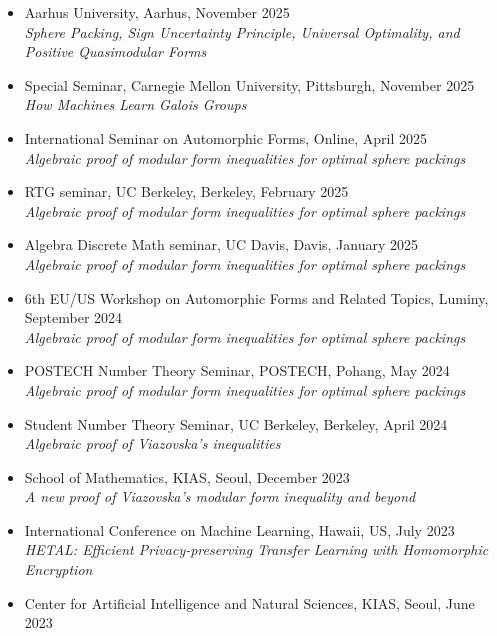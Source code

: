 \documentclass[letterpaper,11pt]{article}
\begin{document}
\begin{itemize}
\begin{itemize}
		{\color{muted}\textit{Sphere Packing, Sign Uncertainty Principle, Universal Optimality, and Positive Quasimodular Forms}}
		\item Aarhus University, Aarhus, November 2025 \\
		{\color{muted}\textit{Sphere Packing, Sign Uncertainty Principle, Universal Optimality, and Positive Quasimodular Forms}}
		\item Special Seminar, Carnegie Mellon University, Pittsburgh, November 2025 \\
		{\color{muted}\textit{How Machines Learn Galois Groups}}
		\item International Seminar on Automorphic Forms, Online, April 2025 \\
		{\color{muted}\textit{Algebraic proof of modular form inequalities for optimal sphere packings}}
		\item RTG seminar, UC Berkeley, Berkeley, February 2025 \\
		{\color{muted}\textit{Algebraic proof of modular form inequalities for optimal sphere packings}}
		\item Algebra Discrete Math seminar, UC Davis, Davis, January 2025 \\
		{\color{muted}\textit{Algebraic proof of modular form inequalities for optimal sphere packings}}
		\item 6th EU/US Workshop on Automorphic Forms and Related Topics, Luminy, September 2024 \\
		{\color{muted}\textit{Algebraic proof of modular form inequalities for optimal sphere packings}}
		\item POSTECH Number Theory Seminar, POSTECH, Pohang, May 2024 \\
		{\color{muted}\textit{Algebraic proof of modular form inequalities for optimal sphere packings}}
		\item Student Number Theory Seminar, UC Berkeley, Berkeley, April 2024 \\
		{\color{muted}\textit{Algebraic proof of Viazovska's inequalities}}
		\item School of Mathematics, KIAS, Seoul, December 2023 \\
		{\color{muted}\textit{A new proof of Viazovska's modular form inequality and beyond}}
		\item International Conference on Machine Learning, Hawaii, US, July 2023 \\
		{\color{muted}\textit{HETAL: Efficient Privacy-preserving Transfer Learning with Homomorphic Encryption}}
		\item Center for Artificial Intelligence and Natural Sciences, KIAS, Seoul, June 2023 \\

\end{itemize}
\end{itemize}
\end{document}
